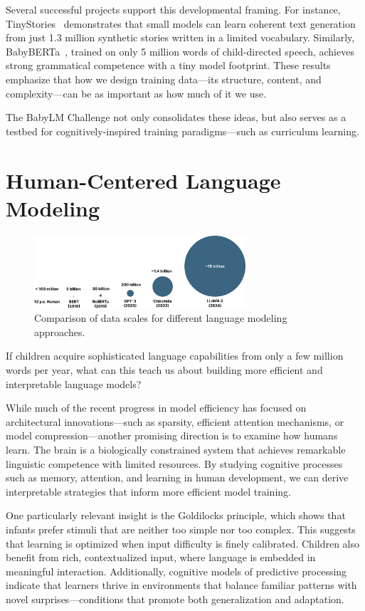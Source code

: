 Several successful projects support this developmental framing. For instance, TinyStories~\citep{eldan2023tinystories} demonstrates that small models can learn coherent text generation from just 1.3 million synthetic stories written in a limited vocabulary. Similarly, BabyBERTa~\citep{huebner2021babyberta}, trained on only 5 million words of child-directed speech, achieves strong grammatical competence with a tiny model footprint. These results emphasize that how we design training data—its structure, content, and complexity—can be as important as how much of it we use.

The BabyLM Challenge not only consolidates these ideas, but also serves as a testbed for cognitively-inspired training paradigms—such as curriculum learning.

\section{Human-Centered Language Modeling}

\begin{figure}[h]
    \centering
    \includegraphics[width=0.7\textwidth]{chapters/background/figures/data_comparison.pdf}
    \caption{Comparison of data scales for different language modeling approaches.}
    \label{fig:data-comparison}
\end{figure}

If children acquire sophisticated language capabilities from only a few million words per year, what can this teach us about building more efficient and interpretable language models?

While much of the recent progress in model efficiency has focused on architectural innovations—such as sparsity, efficient attention mechanisms, or model compression—another promising direction is to examine how humans learn. The brain is a biologically constrained system that achieves remarkable linguistic competence with limited resources. By studying cognitive processes such as memory, attention, and learning in human development, we can derive interpretable strategies that inform more efficient model training.

One particularly relevant insight is the Goldilocks principle\citep{kidd2012goldilocks}, which shows that infants prefer stimuli that are neither too simple nor too complex. This suggests that learning is optimized when input difficulty is finely calibrated. Children also benefit from rich, contextualized input\citep{bergelson2015early, weizman2001lexical}, where language is embedded in meaningful interaction. Additionally, cognitive models of predictive processing~\citep{caucheteux2023evidence} indicate that learners thrive in environments that balance familiar patterns with novel surprises—conditions that promote both generalization and adaptation.

